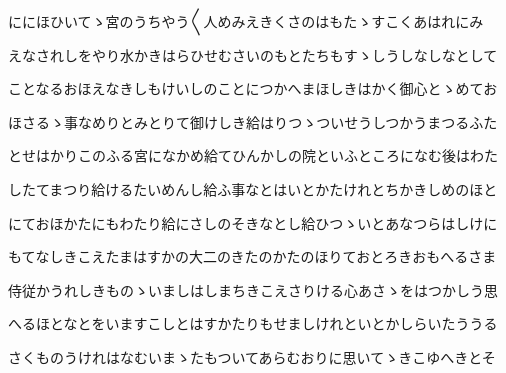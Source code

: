 \documentclass[a4paper,11pt,landscape]{ltjtarticle}
\begin{document}
\par\medskip
ににほひいてゝ宮のうちやう〱人めみえきくさのはもたゝすこくあはれにみ
\par\medskip
えなされしをやり水かきはらひせむさいのもとたちもすゝしうしなしなとして
\par\medskip
ことなるおほえなきしもけいしのことにつかへまほしきはかく御心とゝめてお
\par\medskip
ほさるゝ事なめりとみとりて御けしき給はりつゝついせうしつかうまつるふた
\par\medskip
とせはかりこのふる宮になかめ給てひんかしの院といふところになむ後はわた
\par\medskip
したてまつり給けるたいめんし給ふ事なとはいとかたけれとちかきしめのほと
\par\medskip
にておほかたにもわたり給にさしのそきなとし給ひつゝいとあなつらはしけに
\par\medskip
もてなしきこえたまはすかの大二のきたのかたのほりておとろきおもへるさま
\par\medskip
侍従かうれしきものゝいましはしまちきこえさりける心あさゝをはつかしう思
\par\medskip
へるほとなとをいますこしとはすかたりもせましけれといとかしらいたううる
\par\medskip
さくものうけれはなむいまゝたもついてあらむおりに思いてゝきこゆへきとそ
\par\medskip
\end{document}

